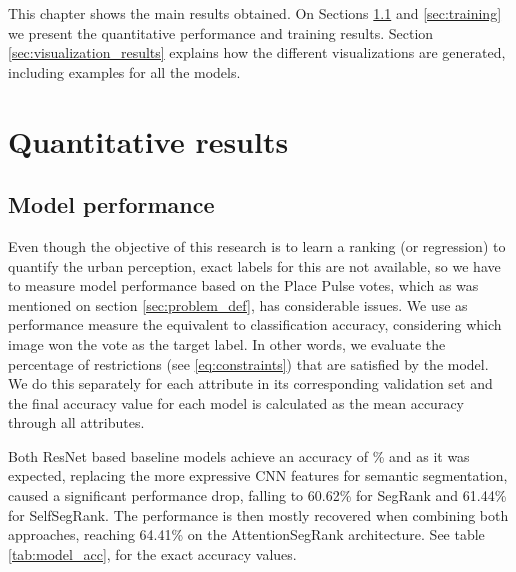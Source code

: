 This chapter shows the main results obtained. On Sections \ref{sec:perf} and \ref{sec:training} we present the quantitative
performance and training results. Section \ref{sec:visualization_results} explains how the different visualizations
are generated, including examples for all the models.

\section{Quantitative results}

\subsection{Model performance}
\label{sec:perf}
Even though the objective of this research is to learn a ranking (or regression) to
quantify the urban perception, exact labels for this are not available, so we have to measure
model performance based on the Place Pulse votes, which as was mentioned on section
\ref{sec:problem_def}, has considerable issues. We use as performance measure the
equivalent to classification accuracy, considering which image won the vote as the target label.
In other words, we evaluate the percentage of restrictions (see \ref{eq:constraints})
that are satisfied by the model. We do this separately for each attribute in its corresponding
validation set and the final accuracy value for each model is calculated as the mean accuracy through
all attributes.

Both ResNet based baseline models achieve an accuracy of \% and
as it was expected, replacing the more expressive CNN features for semantic segmentation,
caused a significant performance drop, falling to 60.62\% for SegRank and 61.44\%
for SelfSegRank. The performance is then mostly recovered when combining both approaches,
reaching 64.41\% on the AttentionSegRank architecture. See table \ref{tab:model_acc}, for the exact accuracy values.


